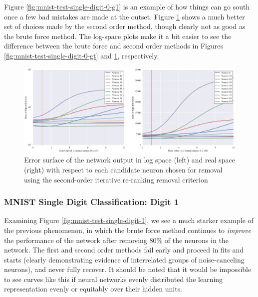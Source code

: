 Figure \ref{fig:mnist-test-single-digit-0-g1} is an example of how things can go south once a few bad mistakes are made at the outset. Figure \ref{fig:mnist-test-single-digit-0-g2} shows a much better set of choices made by the second order method, though clearly not as good as the brute force method. The log-space plots make it a bit easier to see the difference between the brute force and second order methods in Figures \ref{fig:mnist-test-single-digit-0-gt} and \ref{fig:mnist-test-single-digit-0-g2}, respectively. 

\begin{figure}[!ht]
\centering
\includegraphics[width=\linewidth]{png/mnist-test-single-digit-0-g2.pdf}
\caption{Error surface of the network output in log space (left) and real space (right) with respect to each candidate neuron chosen for removal using the second-order iterative re-ranking removal criterion}
\label{fig:mnist-test-single-digit-0-g2}
\end{figure}

\subsubsection{MNIST Single Digit Classification: Digit 1}

Examining Figure \ref{fig:mnist-test-single-digit-1}, we see a much starker example of the previous phenomenon, in which the brute force method continues to \textit{improve} the performance of the network after removing 80\% of the neurons in the network. The first and second order methods fail early and proceed in fits and starts (clearly demonstrating evidence of interrelated groups of noise-canceling neurons), and never fully recover. It should be noted that it would be impossible to see curves like this if neural networks evenly distributed the learning representation evenly or equitably over their hidden units. 

